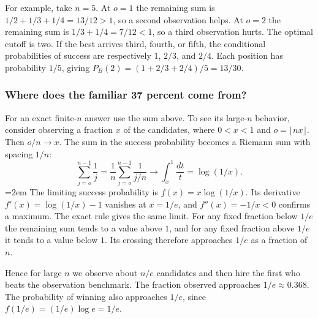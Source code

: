 \documentclass[a4paper,10pt]{article}
\begin{document}
For example, take $n=5$. At $o=1$ the remaining sum is
$1/2+1/3+1/4=13/12>1$, so a second observation helps. At $o=2$ the
remaining sum is $1/3+1/4=7/12<1$, so a third observation hurts.
The optimal cutoff is two. If the best arrives third, fourth, or fifth,
the conditional probabilities of success are respectively $1$, $2/3$, and
$2/4$. Each position has probability $1/5$, giving
$P_B(2)=(1+2/3+2/4)/5=13/30$.

\subsubsection*{Where does the familiar 37 percent come from?}
For an exact finite-$n$ answer use the sum above. To see its large-$n$
behavior, consider observing a fraction $x$ of the candidates, where
$0<x<1$ and $o=\lfloor nx\rfloor$. Then $o/n\to x$. The sum in the success
probability becomes a Riemann sum with spacing $1/n$:
\[
  \sum_{j=o}^{n-1}\frac1j
   =\frac1n\sum_{j=o}^{n-1}\frac1{j/n}
   \longrightarrow \int_x^1\frac{dt}{t}=\log(1/x).
\]
\emergencystretch=2em
The limiting success probability is $f(x)=x\log(1/x)$. Its derivative
$f'(x)=\log(1/x)-1$ vanishes at $x=1/e$, and $f''(x)=-1/x<0$ confirms a
maximum. The exact rule gives the same limit. For any fixed fraction below $1/e$
the remaining sum tends to a value above $1$, and for any fixed fraction
above $1/e$ it tends to a value below $1$. Its crossing therefore approaches
$1/e$ as a fraction of $n$.

Hence for large $n$ we observe about $n/e$ candidates and then hire the
first who beats the observation benchmark. The fraction observed approaches
$1/e\approx0.368$. The probability of winning also approaches $1/e$,
since $f(1/e)=(1/e)\log e=1/e$.
\end{document}
